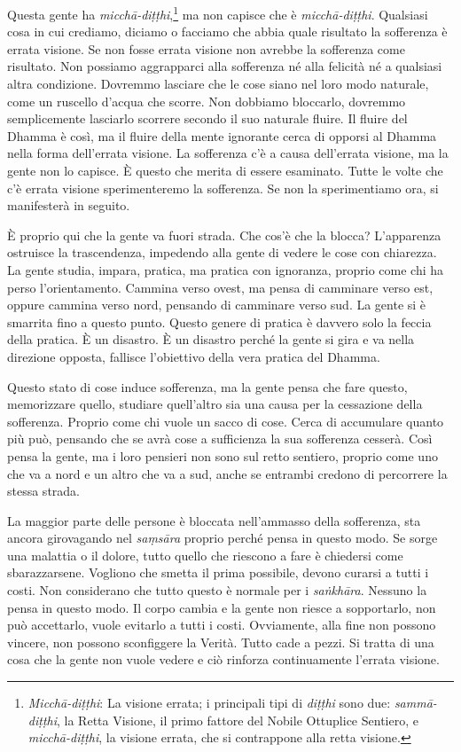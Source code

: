 Questa gente ha \emph{micchā-diṭṭhi},\footnote{\emph{Micchā-diṭṭhi}: La
  visione errata; i principali tipi di \emph{diṭṭhi} sono due:
  \emph{sammā-diṭṭhi}, la Retta Visione, il primo fattore del Nobile
  Ottuplice Sentiero, e \emph{micchā-diṭṭhi}, la visione errata, che si
  contrappone alla retta visione.} ma non capisce che è
\emph{micchā-diṭṭhi}. Qualsiasi cosa in cui crediamo, diciamo o facciamo
che abbia quale risultato la sofferenza è errata visione. Se non fosse
errata visione non avrebbe la sofferenza come risultato. Non possiamo
aggrapparci alla sofferenza né alla felicità né a qualsiasi altra
condizione. Dovremmo lasciare che le cose siano nel loro modo naturale,
come un ruscello d'acqua che scorre. Non dobbiamo bloccarlo, dovremmo
semplicemente lasciarlo scorrere secondo il suo naturale fluire. Il
fluire del Dhamma è così, ma il fluire della mente ignorante cerca di
opporsi al Dhamma nella forma dell'errata visione. La sofferenza c'è a
causa dell'errata visione, ma la gente non lo capisce. È questo che
merita di essere esaminato. Tutte le volte che c'è errata visione
sperimenteremo la sofferenza. Se non la sperimentiamo ora, si
manifesterà in seguito.

È proprio qui che la gente va fuori strada. Che cos'è che la blocca?
L'apparenza ostruisce la trascendenza, impedendo alla gente di vedere le
cose con chiarezza. La gente studia, impara, pratica, ma pratica con
ignoranza, proprio come chi ha perso l'orientamento. Cammina verso
ovest, ma pensa di camminare verso est, oppure cammina verso nord,
pensando di camminare verso sud. La gente si è smarrita fino a questo
punto. Questo genere di pratica è davvero solo la feccia della pratica.
È un disastro. È un disastro perché la gente si gira e va nella
direzione opposta, fallisce l'obiettivo della vera pratica del Dhamma.

Questo stato di cose induce sofferenza, ma la gente pensa che fare
questo, memorizzare quello, studiare quell'altro sia una causa per la
cessazione della sofferenza. Proprio come chi vuole un sacco di cose.
Cerca di accumulare quanto più può, pensando che se avrà cose a
sufficienza la sua sofferenza cesserà. Così pensa la gente, ma i loro
pensieri non sono sul retto sentiero, proprio come uno che va a nord e
un altro che va a sud, anche se entrambi credono di percorrere la stessa
strada.

La maggior parte delle persone è bloccata nell'ammasso della sofferenza,
sta ancora girovagando nel \emph{saṃsāra} proprio perché pensa in questo
modo. Se sorge una malattia o il dolore, tutto quello che riescono a
fare è chiedersi come sbarazzarsene. Vogliono che smetta il prima
possibile, devono curarsi a tutti i costi. Non considerano che tutto
questo è normale per i \emph{saṅkhāra}. Nessuno la pensa in questo modo.
Il corpo cambia e la gente non riesce a sopportarlo, non può accettarlo,
vuole evitarlo a tutti i costi. Ovviamente, alla fine non possono
vincere, non possono sconfiggere la Verità. Tutto cade a pezzi. Si
tratta di una cosa che la gente non vuole vedere e ciò rinforza
continuamente l'errata visione.

